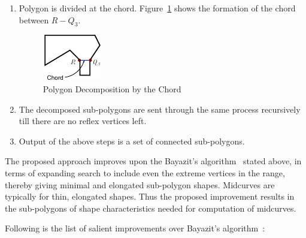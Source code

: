 \begin{enumerate}
\begin{enumerate}
\end{enumerate}

\item Polygon is divided at the chord. Figure~\ref{fig_divide} shows the formation of the chord between $R-Q_3$.


\begin{figure}[h]
\centering \includegraphics[width=0.28\linewidth]{../Common/images/polydecomp_divide_1.pdf} 
\caption{Polygon Decomposition by the Chord}
\label{fig_divide}
\end{figure}



\item 
The decomposed sub-polygons are sent through the same process recursively till there are no reflex vertices left. 

\item  
Output of the above steps is a set of connected sub-polygons. 

\end{enumerate}



The proposed approach improves upon the Bayazit's algorithm~\cite{Bayazit} stated above, in terms of expanding search to include even the extreme vertices in the range, thereby giving minimal and elongated sub-polygon shapes. Midcurves are typically for thin, elongated shapes. Thus the proposed improvement results in the sub-polygons of shape characteristics needed for computation of midcurves.

Following is the list of salient improvements over  Bayazit's algorithm~\cite{Bayazit}:

